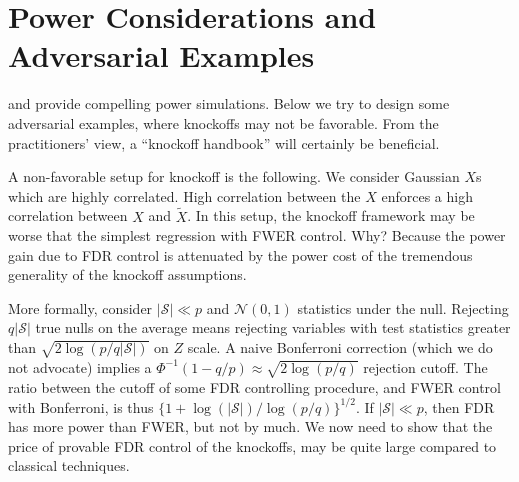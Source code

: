 \documentclass[article,lineno]{biometrika}
\begin{document}
	
	
	
	
	\section{Power Considerations and Adversarial Examples}
	
	
	\cite{SesiaGenehuntinghidden} and \cite{CandesPanninggoldmodelX2018} provide compelling power simulations.
	Below we try to design some adversarial examples, where knockoffs may not be favorable.
	From the practitioners' view, a ``knockoff handbook'' will certainly be beneficial.
	
	A non-favorable setup for knockoff is the following. 
	We consider Gaussian $X$s which are highly correlated. High correlation between the $X$ enforces a high correlation between  $X$ and $\tilde X$. 
	In this setup, the knockoff framework may be  worse that the simplest regression with FWER control.
	Why?
	Because the power gain due to FDR control is attenuated by the power cost of the tremendous generality of the knockoff assumptions.
	
	More formally, consider $|\mathcal{S}|\ll p$ and $\mathcal{N}(0,1)$ statistics under the null.	
	Rejecting $q|\mathcal{S}|$ true nulls on the average means rejecting variables with test statistics greater than $\sqrt{2\log(p/q|\mathcal{S}|)}$ on $Z$ scale.
	A naive Bonferroni correction (which we do not advocate) implies a $\Phi^{-1}(1-q/p)\approx\sqrt{2\log (p/q)}$ rejection cutoff.
	The ratio between the cutoff of some FDR controlling procedure, and FWER control with Bonferroni, is thus $\bigl\{1+\log(|\mathcal{S}|)/\log (p/q)\bigr\}^{1/2}$. 
	If $|\mathcal{S}|\ll p$, then FDR has more power than FWER, but not by much. 
	We now need to show that the price of provable FDR control of the knockoffs, may be quite large compared to classical techniques.
	
\end{document}
